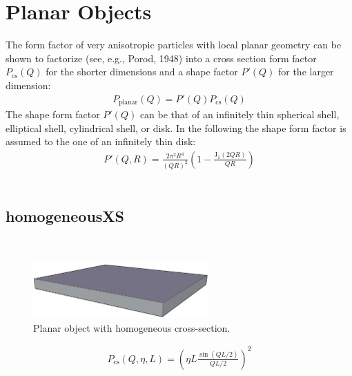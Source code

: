 \section{Planar Objects}
The form factor of very anisotropic particles with local planar
geometry can be shown to factorize (see, e.g., Porod, 1948) into a
cross section form factor $P_\text{cs}(Q)$ for the shorter
dimensions and a shape factor $P'(Q)$ for the larger dimension:
\begin{align}
P_\text{planar}(Q) = P'(Q) P_\text{cs}(Q)
\end{align}
The shape form factor $P'(Q)$ can be that of an infinitely thin
spherical shell, elliptical shell, cylindrical shell, or disk. In
the following the shape form factor is assumed to the one of an
infinitely thin disk:
\begin{align}
P'(Q,R)=\frac{2\pi^2R^4}{(QR)^2}
\left(1-\frac{\text{J}_1(2QR)}{QR}\right)
\end{align}
\\

\clearpage
\subsection{homogeneousXS}
\label{sect:homogeneousXS}
\hspace{1pt} \\
\begin{figure}[htb]
\begin{center}
\includegraphics[width=0.6\textwidth,height=0.4\textwidth]{planarHomo.png}
\end{center}
\caption{Planar object with homogeneous cross-section.}
\label{fig:planarHomo}
\end{figure}

\begin{align}
P_\text{cs}(Q,\eta,L) = \left( \eta L\frac{\sin(QL/2)}{QL/2}\right)^2
\end{align}


